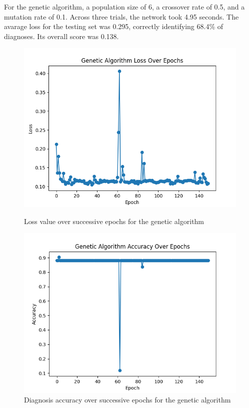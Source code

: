 \documentclass[12pt]{article}
\begin{document}
        For the genetic algorithm, a population size of 6, a crossover rate of 0.5, and a mutation rate of 0.1.  Across three trials, the network
        took 4.95 seconds.  The avarage loss for the testing set was 0.295, correctly identifying 68.4\% of diagnoses.  Its overall score was 0.138.
        
        \begin{figure}[ht]
            \begin{minipage}{0.48\textwidth}
                \centering
                \includegraphics[width=.9\linewidth]{geneticlosses.png}
                \caption{Loss value over successive epochs for the genetic algorithm}
            \end{minipage}\hfill
            \begin{minipage}{0.48\textwidth}
                \centering
                \includegraphics[width=.9\linewidth]{geneticaccuracy.png}
                \caption{Diagnosis accuracy over successive epochs for the genetic algorithm}
            \end{minipage}
        \end{figure}
        
\end{document}
